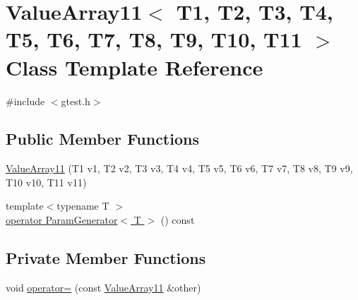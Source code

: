 \hypertarget{classtesting_1_1internal_1_1ValueArray11}{\section{\-Value\-Array11$<$ \-T1, \-T2, \-T3, \-T4, \-T5, \-T6, \-T7, \-T8, \-T9, \-T10, \-T11 $>$ \-Class \-Template \-Reference}
\label{df/d49/classtesting_1_1internal_1_1ValueArray11}
}


{\ttfamily \#include $<$gtest.\-h$>$}

\subsection*{\-Public \-Member \-Functions}
\begin{DoxyCompactItemize}
\item 
\hyperlink{classtesting_1_1internal_1_1ValueArray11_a7b4ef1416ceefc8ab18b2bdb7f19a998}{\-Value\-Array11} (\-T1 v1, \-T2 v2, \-T3 v3, \-T4 v4, \-T5 v5, \-T6 v6, \-T7 v7, \-T8 v8, \-T9 v9, \-T10 v10, \-T11 v11)
\item 
{\footnotesize template$<$typename T $>$ }\\\hyperlink{classtesting_1_1internal_1_1ValueArray11_a08ef46fa12c9dd8ef6fc630baeea89b7}{operator Param\-Generator$<$ T $>$} () const 
\end{DoxyCompactItemize}
\subsection*{\-Private \-Member \-Functions}
\begin{DoxyCompactItemize}
\item 
void \hyperlink{classtesting_1_1internal_1_1ValueArray11_ae2d866a9e8bfeb0a9f400faf41e00a1e}{operator=} (const \hyperlink{classtesting_1_1internal_1_1ValueArray11}{\-Value\-Array11} \&other)
\end{DoxyCompactItemize}
